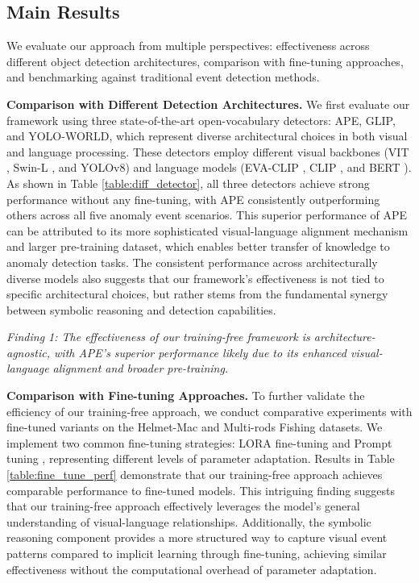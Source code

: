 \subsection{Main Results}
We evaluate our approach from multiple perspectives: effectiveness across different object detection architectures, comparison with fine-tuning approaches, and benchmarking against traditional event detection methods. \par
% 
\noindent
\textbf{Comparison with Different Detection Architectures.} We first evaluate our framework using three state-of-the-art open-vocabulary detectors: APE, GLIP, and YOLO-WORLD, which represent diverse architectural choices in both visual and language processing. These detectors employ different visual backbones (VIT \cite{dosovitskiy2020image}, Swin-L \cite{liu2021swin}, and YOLOv8) and language models (EVA-CLIP \cite{sun2023eva}, CLIP \cite{radford2021learning}, and BERT \cite{devlin2019bert}). As shown in Table \ref{table:diff_detector}, all three detectors achieve strong performance without any fine-tuning, with APE consistently outperforming others across all five anomaly event scenarios. This superior performance of APE can be attributed to its more sophisticated visual-language alignment mechanism and larger pre-training dataset, which enables better transfer of knowledge to anomaly detection tasks. The consistent performance across architecturally diverse models also suggests that our framework's effectiveness is not tied to specific architectural choices, but rather stems from the fundamental synergy between symbolic reasoning and detection capabilities. \par
\noindent
\textit{Finding 1: The effectiveness of our training-free framework is architecture-agnostic, with APE's superior performance likely due to its enhanced visual-language alignment and broader pre-training.} \par
% 
\noindent
\textbf{Comparison with Fine-tuning Approaches.} To further validate the efficiency of our training-free approach, we conduct comparative experiments with fine-tuned variants on the Helmet-Mac and Multi-rods Fishing datasets. We implement two common fine-tuning strategies: LORA fine-tuning\cite{hu2021lora} and Prompt tuning \cite{lester2021power}, representing different levels of parameter adaptation. Results in Table \ref{table:fine_tune_perf} demonstrate that our training-free approach achieves comparable performance to fine-tuned models. This intriguing finding suggests that our training-free approach effectively leverages the model's general understanding of visual-language relationships. Additionally, the symbolic reasoning component provides a more structured way to capture visual event patterns compared to implicit learning through fine-tuning, achieving similar effectiveness without the computational overhead of parameter adaptation.\par
